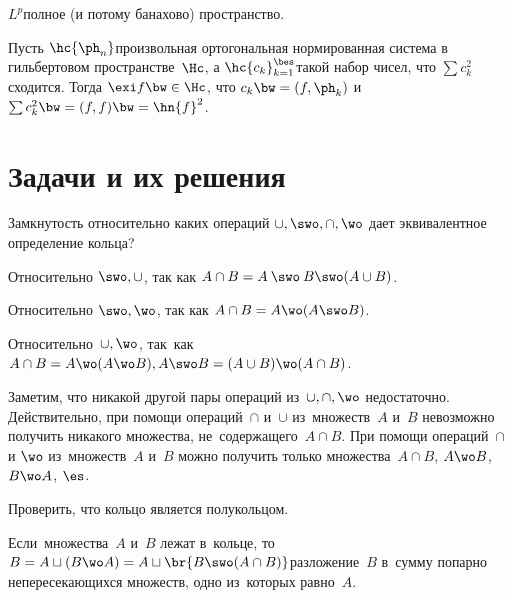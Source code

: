 \documentclass[a4paper]{article}
\begin{document}
\begin{stm}
  $L^p$\т полное (и потому банахово) пространство.
\end{stm}

\begin{theorem}
  Пусть $\hc{\ph_n}$\т произвольная ортогональная нормированная система в гильбертовом пространстве~$\Hc$,
  а $\hc{c_k}_{k=1}^\bes$\т такой набор чисел, что $\sum c_k^2$ сходится.
  Тогда $\exi f\bw\in \Hc$, что $c_k \bw= (f,\ph_k)$ и $\sum c_k^2\bw=(f,f) \bw= \hn{f}^2$.
\end{theorem}

\pagebreak

\section{Задачи и их решения}

\begin{problem}
  Замкнутость относительно каких операций $\cup, \swo, \cap, \wo$ дает эквивалентное определение кольца?
\end{problem}
\begin{solution}
  \begin{items}{-3}
     \item Относительно $\swo, \cup$, так как $A \cap B = A \mathbin{\swo} B \swo (A\cup B)$.
     \item Относительно $\swo, \wo$, так как $A\cap B = A \wo (A \swo B)$.
     \item Относительно~$\cup, \wo$, так~как~$A\cap B = A \wo (A \wo B), A\swo B = (A\cup B) \wo (A\cap B)$.
  \end{items}

  Заметим, что никакой другой пары операций из~$\cup, \cap, \wo$ недостаточно. Действительно,
  при помощи операций~$\cap$ и~$\cup$ из~множеств~$A$  и~$B$ невозможно получить никакого
  множества, не~содержащего~$A\cap B$. При помощи операций~$\cap$ и $\wo$ из~множеств~$A$ и~$B$
  можно получить только множества~$A\cap B$, $A\wo B$, $B\wo A$, $\es$.
\end{solution}

\begin{problem}
  Проверить, что кольцо является полукольцом.
\end{problem}
\begin{solution}
  Если~множества~$A$ и~$B$ лежат в~кольце, то~$B=A\sqcup (B\wo A) =
  A\sqcup \br{B\swo (A\cap B)}$\Т разложение~$B$ в~сумму попарно
  непересекающихся множеств, одно из~которых равно~$A$.
\end{solution}
\end{document}
